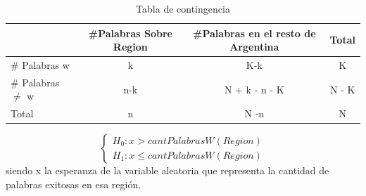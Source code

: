\begin{table}[ht]
\centering
\label{tab:contingencia}
\begin{tabular}{lccc}
\hline
& \#Palabras Sobre Region &\#Palabras en el resto de Argentina &Total \\ \hline
\# Palabras w &   k & K-k & K \\ 
\# Palabras $\neq$ w & n-k & N + k - n - K  & N - K \\ 
Total & n & N -n & N \\ \hline
\end{tabular}
\caption{Tabla de contingencia}

\end{table}



$$
\begin{cases}
H_0 :  x > cantPalabrasW(Region) \\
H_1 : x \leq cantPalabrasW(Region)
\end{cases}
$$  
siendo x la esperanza de la variable aleatoria que representa la cantidad de palabras exitosas en esa región.
